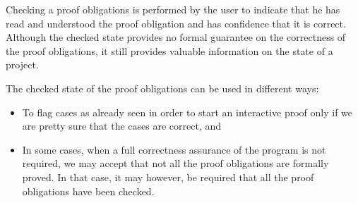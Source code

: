 Checking a proof obligations is performed by the user to indicate that
he has read and understood the proof obligation and has confidence
that it is correct. Although the checked state provides no formal
guarantee on the correctness of the proof obligations, it still
provides valuable information on the state of a project.

The checked state of the proof obligations can be used in different
ways:
\begin{itemize}
\item To flag cases as already seen in order to start an interactive
   proof only if we are pretty sure that the cases are correct, and
\item In some cases, when a full correctness assurance of the program is not
   required, we may accept that not all the proof obligations are
   formally proved. In that case, it may however, be required that all
   the proof obligations have been checked.
\end{itemize}

